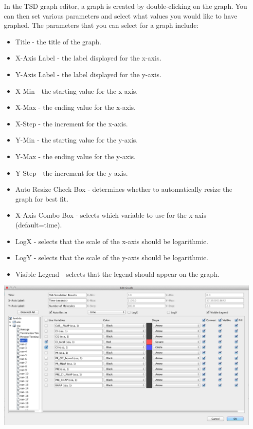 \documentclass[titlepage,11pt]{article}
\begin{document}
In the TSD graph editor, a graph is created by double-clicking on the graph. You can then set various parameters and select what values you would like to have graphed. The parameters that you can select for a graph include: 
\begin{itemize}
\item Title - the title of the graph.
\item X-Axis Label - the label displayed for the x-axis. 
\item Y-Axis Label - the label displayed for the y-axis. 
\item X-Min - the starting value for the x-axis. 
\item X-Max - the ending value for the x-axis. 
\item X-Step - the increment for the x-axis. 
\item Y-Min - the starting value for the y-axis. 
\item Y-Max - the ending value for the y-axis. 
\item Y-Step - the increment for the y-axis. 
\item Auto Resize Check Box - determines whether to automatically resize the graph for best fit. 
\item X-Axis Combo Box - selects which variable to use for the x-axis (default=time).
\item LogX - selects that the scale of the x-axis should be logarithmic.
\item LogY - selects that the scale of the y-axis should be logarithmic.
\item Visible Legend - selects that the legend should appear on the graph.
\end{itemize}

\begin{center}
\includegraphics[width=160mm]{screenshots/ssaResults}
\end{center}
\end{document}
